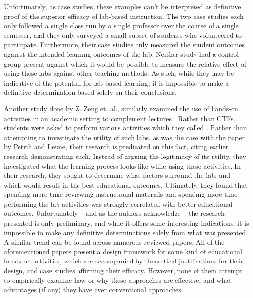 \documentclass{article}
\begin{document}
    Unfortunately, as case studies, these examples can’t be interpreted as definitive proof of the superior efficacy of lab-based instruction. 
    The two case studies each only followed a single class run by a single professor over the course of a single semester, and they only surveyed a small subset of students who volunteered to participate. 
    Furthermore, their case studies only measured the student outcomes against the intended learning outcomes of the lab. 
    Neither study had a control group present against which it would be possible to measure the relative effect of using these labs against other teaching methods. 
    As such, while they may be indicative of the potential for lab-based learning, it is impossible to make a definitive determination based solely on their conclusions.

    Another study done by Z. Zeng et. al., similarly examined the use of hands-on activities in an academic setting to complement lectures \cite{Z-Zeng}. 
    Rather than CTFs, students were asked to perform various activities which they called . 
    Rather than attempting to investigate the utility of such labs, as was the case with the paper by Petrili and Leune, their research is predicated on this fact, citing earlier research demonstrating such. 
    Instead of arguing the legitimacy of its utility, they investigated what the learning process looks like while using these activities. 
    In their research, they sought to determine what factors surround the lab, and which would result in the best educational outcomes. 
    Ultimately, they found that spending more time reviewing instructional materials and spending more time performing the lab activities was strongly correlated with better educational outcomes. 
    Unfortunately -- and as the authors acknowledge -- the research presented is only preliminary, and while it offers some interesting indications, it is impossible to make any definitive determinations solely from what was presented. 
    A similar trend can be found across numerous reviewed papers\cite{Y-Deng,W-Du,N-Eliot}. 
    All of the aforementioned papers present a design framework for some kind of educational hands-on activities, which are accompanied by theoretical justifications for their design, and case studies affirming their efficacy. 
    However, none of them attempt to empirically examine how or why these approaches are effective, and what advantages (if any) they have over conventional approaches. 
\end{document}
